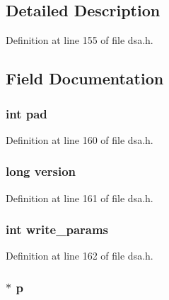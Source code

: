 \subsection{Detailed Description}


Definition at line 155 of file dsa.\+h.



\subsection{Field Documentation}
\subsubsection[{\texorpdfstring{pad}{pad}}]{\setlength{\rightskip}{0pt plus 5cm}int pad}\hypertarget{structdsa__st_af1d40a330bc745f51d8b079c9dc473ff}{}\label{structdsa__st_af1d40a330bc745f51d8b079c9dc473ff}


Definition at line 160 of file dsa.\+h.

\subsubsection[{\texorpdfstring{version}{version}}]{\setlength{\rightskip}{0pt plus 5cm}long version}\hypertarget{structdsa__st_a17afc5cf84cee4b2123665f28ce85c9f}{}\label{structdsa__st_a17afc5cf84cee4b2123665f28ce85c9f}


Definition at line 161 of file dsa.\+h.

\subsubsection[{\texorpdfstring{write\+\_\+params}{write_params}}]{\setlength{\rightskip}{0pt plus 5cm}int write\+\_\+params}\hypertarget{structdsa__st_a636bec232abffe90c26bde0a196e4c2e}{}\label{structdsa__st_a636bec232abffe90c26bde0a196e4c2e}


Definition at line 162 of file dsa.\+h.

\subsubsection[{\texorpdfstring{p}{p}}]{$\ast$ p}\hypertarget{structdsa__st_a4ed2e531b9fd8a6ca6ad6804565299a7}{}\label{structdsa__st_a4ed2e531b9fd8a6ca6ad6804565299a7}


